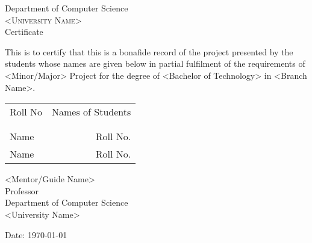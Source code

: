 \newpage
\thispagestyle{empty}

\begin{center}

\huge{Department of Computer Science}\\[0.5cm]
\normalsize
\textsc{<University Name>}\\[2.0cm]

\LARGE Certificate\\[2.5cm]
\end{center}
\normalsize This is to certify that this is a bonafide record of the project presented by the students whose names are given below in partial fulfilment of the requirements of <Minor/Major> Project for the degree of <Bachelor of Technology> in <Branch Name>.\\[1.0cm]

\begin{table}[h]
\centering
\begin{tabular}{lr}
Roll No & Names of Students \\ \\ \hline
\\
Name & Roll No. \\ 
Name & Roll No. \\
\end{tabular}
\end{table}

\vfill


\begin{flushright}
<Mentor/Guide Name>\\
Professor\\
Department of Computer Science\\
<University Name>\\
\end{flushright}

\begin{flushleft}
Date: \today
\end{flushleft}